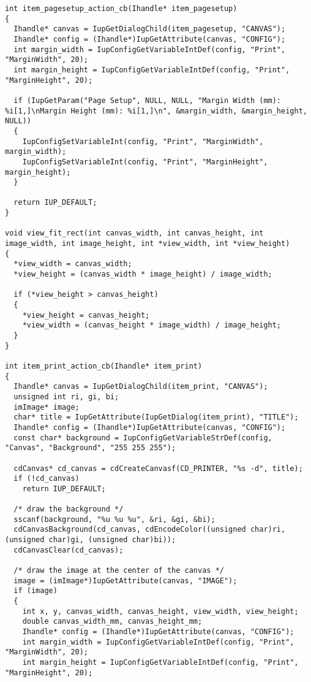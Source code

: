 \documentclass{ctexart}
\begin{document}
\begin{lstlisting}
int item_pagesetup_action_cb(Ihandle* item_pagesetup)
{
  Ihandle* canvas = IupGetDialogChild(item_pagesetup, "CANVAS");
  Ihandle* config = (Ihandle*)IupGetAttribute(canvas, "CONFIG");
  int margin_width = IupConfigGetVariableIntDef(config, "Print", "MarginWidth", 20);
  int margin_height = IupConfigGetVariableIntDef(config, "Print", "MarginHeight", 20);

  if (IupGetParam("Page Setup", NULL, NULL, "Margin Width (mm): %i[1,]\nMargin Height (mm): %i[1,]\n", &margin_width, &margin_height, NULL))
  {
    IupConfigSetVariableInt(config, "Print", "MarginWidth", margin_width);
    IupConfigSetVariableInt(config, "Print", "MarginHeight", margin_height);
  }

  return IUP_DEFAULT;
}

void view_fit_rect(int canvas_width, int canvas_height, int image_width, int image_height, int *view_width, int *view_height)
{
  *view_width = canvas_width;
  *view_height = (canvas_width * image_height) / image_width;

  if (*view_height > canvas_height)
  {
    *view_height = canvas_height;
    *view_width = (canvas_height * image_width) / image_height;
  }
}

int item_print_action_cb(Ihandle* item_print)
{
  Ihandle* canvas = IupGetDialogChild(item_print, "CANVAS");
  unsigned int ri, gi, bi;
  imImage* image;
  char* title = IupGetAttribute(IupGetDialog(item_print), "TITLE");
  Ihandle* config = (Ihandle*)IupGetAttribute(canvas, "CONFIG");
  const char* background = IupConfigGetVariableStrDef(config, "Canvas", "Background", "255 255 255");

  cdCanvas* cd_canvas = cdCreateCanvasf(CD_PRINTER, "%s -d", title);
  if (!cd_canvas)
    return IUP_DEFAULT;

  /* draw the background */
  sscanf(background, "%u %u %u", &ri, &gi, &bi);
  cdCanvasBackground(cd_canvas, cdEncodeColor((unsigned char)ri, (unsigned char)gi, (unsigned char)bi));
  cdCanvasClear(cd_canvas);

  /* draw the image at the center of the canvas */
  image = (imImage*)IupGetAttribute(canvas, "IMAGE");
  if (image)
  {
    int x, y, canvas_width, canvas_height, view_width, view_height;
    double canvas_width_mm, canvas_height_mm;
    Ihandle* config = (Ihandle*)IupGetAttribute(canvas, "CONFIG");
    int margin_width = IupConfigGetVariableIntDef(config, "Print", "MarginWidth", 20);
    int margin_height = IupConfigGetVariableIntDef(config, "Print", "MarginHeight", 20);


\end{lstlisting}
\end{document}
